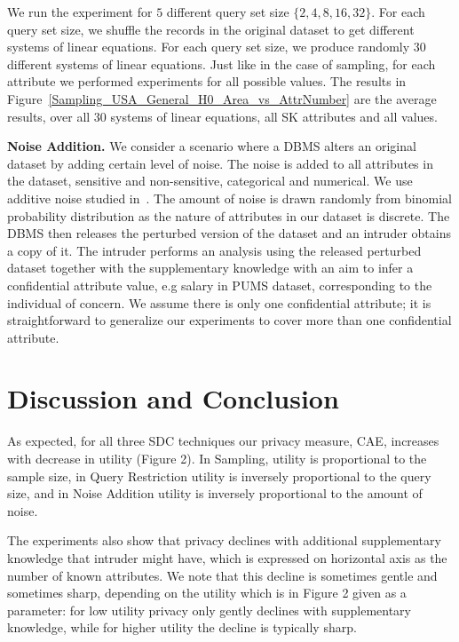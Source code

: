 \documentclass{llncs}
\begin{document}
We run the experiment for $5$ different query set size
$\{2,4,8,16,32\}$. For each query set size, we shuffle the records
in the original dataset to get different systems of linear
equations. For each query set size, we produce randomly $30$
different systems of linear equations. Just like in the case of
sampling, for each attribute we performed experiments for all
possible values. The results in Figure~\ref{Sampling_USA_General_H0_Area_vs_AttrNumber} are
the average results, over all $30$ systems of linear equations,
all SK attributes and all values.



 \textbf{Noise Addition.} We consider a scenario where a DBMS alters an original dataset by adding certain level of noise.
 The noise is added to all attributes in the dataset, sensitive and  non-sensitive, categorical and numerical.
 We use additive noise studied in~\cite{Kim:Method86,Tendick:Optimal91,Fuller:Masking93,KimWinkler:Masking95,Yancey:disclos02}.
 The amount of noise is drawn randomly from binomial probability distribution as the nature of attributes in our dataset is discrete.
 The DBMS then releases the perturbed version of the dataset and an intruder obtains a copy of it.  The intruder
 performs an analysis using the released perturbed dataset together with the supplementary knowledge with an aim to infer a confidential
 attribute value, e.g salary in PUMS dataset, corresponding to the individual of concern. We assume there is only one confidential attribute;
 it is straightforward to generalize our experiments to cover more than one confidential attribute.







\section{Discussion and Conclusion}

As expected, for all three SDC techniques our privacy measure, CAE, increases with decrease in utility (Figure 2). In Sampling, utility
is proportional to the sample size, in Query Restriction  utility is inversely proportional to the query size, and in Noise Addition utility is inversely proportional to the amount of noise.

The experiments also show that privacy  declines with additional supplementary knowledge that intruder might have, which is expressed on horizontal axis as the number of known attributes. We note that this decline is sometimes gentle and sometimes sharp, depending on the utility which is in  Figure 2 given as a parameter: for low utility privacy only gently declines with supplementary knowledge, while for higher utility the decline is typically sharp.
\end{document}
